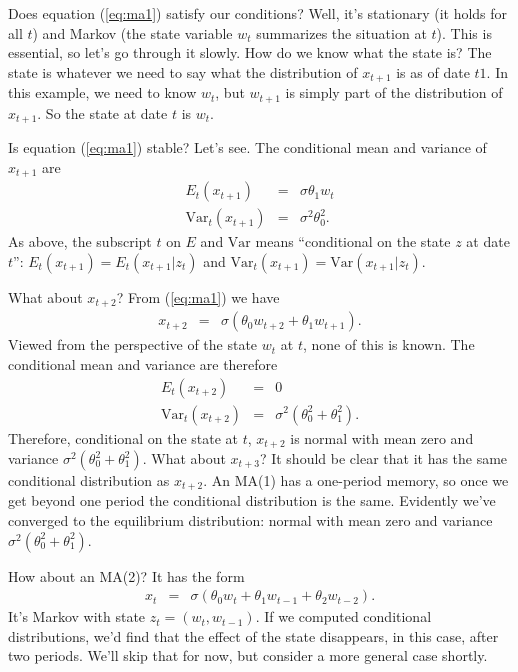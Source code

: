 \documentclass[11pt]{article}
\begin{document}
Does equation (\ref{eq:ma1}) satisfy our conditions?
Well, it's stationary (it holds for all $t$)
and Markov (the state variable $w_t$ summarizes the situation at $t$).
This is essential, so let's go through it slowly.
How do we know what the state is?
The state is whatever we need to say what the distribution of $x_{t+1}$ is
as of date $t1$.
In this example, we need to know $w_{t}$,
but $w_{t+1}$ is simply part of the distribution of $x_{t+1}$.
So the state at date $t$ is $w_{t}$.


Is equation (\ref{eq:ma1}) stable?
Let's see.
The conditional mean and variance of $x_{t+1}$ are
\begin{eqnarray*}
    E_t (x_{t+1}) &=& \sigma \theta_1 w_t  \\
    \mbox{Var}_t(x_{t+1} )
            &=&  \sigma^2 \theta_0^2  .
\end{eqnarray*}
As above, the subscript $t$ on $E$ and $\mbox{Var}$
means ``conditional on the state $z$ at date $t$'':
$  E_t (x_{t+1} ) = E_t (x_{t+1} | z_{t} ) $ and
$  \mbox{Var}_t(x_{t+1}  ) =  \mbox{Var}(x_{t+1} | z_{t} ) $.

What about $x_{t+2}$?
From (\ref{eq:ma1}) we have
\begin{eqnarray*}
    x_{t+2}  &=& \sigma \left( \theta_0 w_{t+2} + \theta_1 w_{t+1} \right) .
\end{eqnarray*}
Viewed from the perspective of the state $w_t$ at $t$, none of this is known.
The conditional mean and variance are therefore
\begin{eqnarray*}
    E_t (x_{t+2} ) &=& 0   \\
    \mbox{Var}_t (x_{t+2} )
            &=&  \sigma^2 \left( \theta_0^2 + \theta_1^2 \right).
\end{eqnarray*}
Therefore, conditional on the state at $t$,
$x_{t+2}$ is normal with mean zero and variance $ \sigma^2 (\theta_0^2 + \theta_1^2)$.
What about $x_{t+3}$?
It should be clear that it has the same conditional distribution as $x_{t+2}$.
An MA(1) has a one-period memory, so once we get beyond one period
the conditional distribution is the same.
Evidently we've converged to the equilibrium distribution:
normal with mean zero and variance $ \sigma^2 (\theta_0^2 + \theta_1^2)$.

How about an MA(2)?
It has the form
\begin{eqnarray*}
    x_{t}  &=& \sigma \left( \theta_0 w_{t} + \theta_1 w_{t-1}
    + \theta_2 w_{t-2} \right) .
\end{eqnarray*}
It's Markov with state $z_{t} = (w_{t}, w_{t-1})$.
If we computed conditional distributions, we'd find that the effect
of the state disappears, in this case, after two periods.
We'll skip that for now, but consider a more general case shortly.
\end{document}
